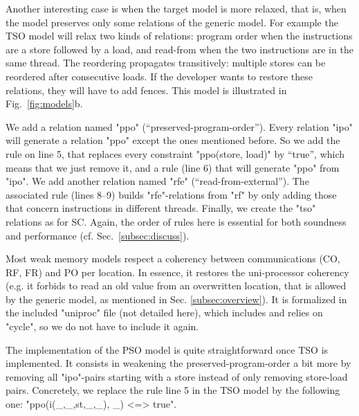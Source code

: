 Another interesting case is when the target model
is more relaxed, that is, when the model preserves only some relations 
of the generic model. 
For example the TSO model 
will relax two kinds of relations: program order when the instructions are a store 
followed by a load, and read-from when the two instructions are in the same 
thread. The reordering propagates transitively: multiple stores can be reordered 
after consecutive loads.
If the developer wants to restore these relations, they will have to add 
fences. This model is illustrated in Fig.~\ref{fig:models}b.

We add a relation named "ppo" (``preserved-program-order''). Every
relation "ipo" will generate a relation "ppo" except the ones mentioned
before.  So we add the rule on line 5, that replaces every constraint
"ppo(store, load)" by ``true'', which means that we just remove it,
and a rule (line 6) that will generate "ppo" from "ipo". %
We add another relation named "rfe" (``read-from-external''). The associated rule
(lines 8--9) builds "rfe"-relations from "rf" by only adding those that
concern instructions in different threads.  Finally, we create the "tso"
relations as for SC. Again, the order of rules here is essential for 
both soundness and performance (cf. Sec.~\ref{subsec:discuss}).

Most weak memory models respect a coherency between communications
(CO, RF, FR) and PO per location. In essence, it restores
the uni-processor coherency (e.g. it forbids to read an old value from
an overwritten location, that is allowed by the generic
model, as mentioned in Sec. \ref{subsec:overview}). 
It is formalized in the included "uniproc" file (not detailed here),
which includes and relies on "cycle", so we do not have to include it again.

The implementation of the PSO model is quite straightforward once
TSO is implemented. It consists in weakening the preserved-program-order 
a bit more by removing all "ipo"-pairs starting with a store
instead of only removing store-load pairs. Concretely, we 
replace the rule line 5 in the TSO model by the following one:
"ppo(i(_,_,st,_,_), _) <=> true".


